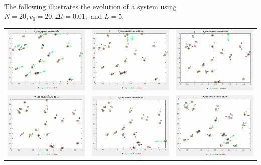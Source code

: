 \documentclass[11.5pt]{article}
\newcounter{graphics}
\begin{document}
\paragraph{}
The following illustrates the evolution of a system using $N=20, v_0 = 20, \Delta t = 0.01,$ and $L=5$. 
\begin{center}
\begin{tabular}{ccc}
\includegraphics[width = 2in]{1.png}&\includegraphics[width = 2in]{2.png}&\includegraphics[width = 2in]{3.png}\\
\includegraphics[width = 2in]{4.png}&\includegraphics[width = 2in]{5.png}&\includegraphics[width = 2in]{6.png}\\

\end{tabular}
\end{center}
\end{document}
